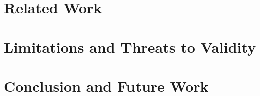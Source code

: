 %


\section{Related Work}
\label{sec:Related}




\section{Limitations and Threats to Validity}
\label{sec:Limit}

\section{Conclusion and Future Work}
\label{sec:Conclusion}

















